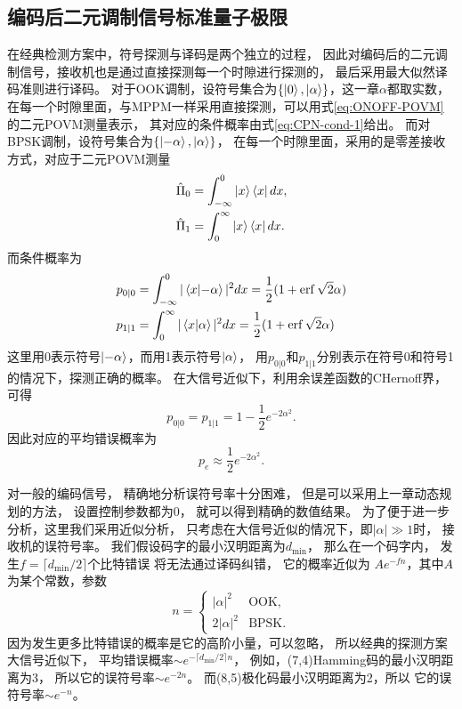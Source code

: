 \subsection{编码后二元调制信号标准量子极限}
在经典检测方案中，符号探测与译码是两个独立的过程，
因此对编码后的二元调制信号，接收机也是通过直接探测每一个时隙进行探测的，
最后采用最大似然译码准则进行译码。
对于OOK调制，设符号集合为$\{\ket{0}, \ket{\alpha}\}$，这一章$\alpha$都取实数，
在每一个时隙里面，与MPPM一样采用直接探测，可以用式\ref{eq:ONOFF-POVM} 的二元POVM测量表示，
其对应的条件概率由式\ref{eq:CPN-cond-1}给出。
而对BPSK调制，设符号集合为$\{\ket{-\alpha}, \ket{\alpha}\}$，
在每一个时隙里面，采用的是零差接收方式，对应于二元POVM测量
\begin{equation}
\begin{split}
\hat{\Pi}_0 &= \int_{-\infty}^0 \ket{x}\bra{x} dx, \\
\hat{\Pi}_1 &= \int_0^{\infty} \ket{x}\bra{x} dx.
\end{split}
\end{equation}
而条件概率为
\begin{equation}
\begin{split}
p_{0|0} &= \int_{-\infty}^0 |\bra{x}\ket{-\alpha}|^2 dx = \frac{1}{2}(1+\erf{\sqrt{2}\alpha}) \\
p_{1|1} &= \int_0^{\infty} |\bra{x}\ket{\alpha}|^2 dx = \frac{1}{2}(1+\erf{\sqrt{2}\alpha}) 
\end{split}
\end{equation}
这里用0表示符号$\ket{-\alpha}$，而用1表示符号$\ket{\alpha}$，
用$p_{0|0}$和$p_{1|1}$分别表示在符号0和符号1的情况下，探测正确的概率。
在大信号近似下，利用余误差函数的CHernoff界\cite{chang2011chernoff}，可得
\begin{equation}
p_{0|0} = p_{1|1} = 1 - \frac{1}{2} e^{-2\alpha^2}.
\end{equation}
因此对应的平均错误概率为
\begin{equation}
p_e \approx \frac{1}{2} e^{-2\alpha^2}.
\end{equation}

对一般的编码信号，
精确地分析误符号率十分困难，
但是可以采用上一章动态规划的方法，
设置控制参数都为0，
就可以得到精确的数值结果。
为了便于进一步分析，这里我们采用近似分析，
只考虑在大信号近似的情况下，即$|\alpha| \gg 1$时，
接收机的误符号率。
我们假设码字的最小汉明距离为$d_{\min}$，
那么在一个码字内，
发生$f = \lceil d_{\min}/2 \rceil$个比特错误
将无法通过译码纠错，
它的概率近似为 $Ae^{-f n}$，其中$A$为某个常数，参数
\begin{equation}
n = \begin{cases}
        |\alpha|^2 & \text{OOK}, \\
        2|\alpha|^2 & \text{BPSK}.
    \end{cases}
\end{equation}
因为发生更多比特错误的概率是它的高阶小量，可以忽略，
所以经典的探测方案大信号近似下，
平均错误概率$\sim e^{-\lceil d_{\min}/2\rceil n}$，
例如，(7,4)Hamming码的最小汉明距离为3，
所以它的误符号率$\sim e^{-2n}$。
而(8,5)极化码最小汉明距离为2，所以
它的误符号率$\sim e^{-n}$。


